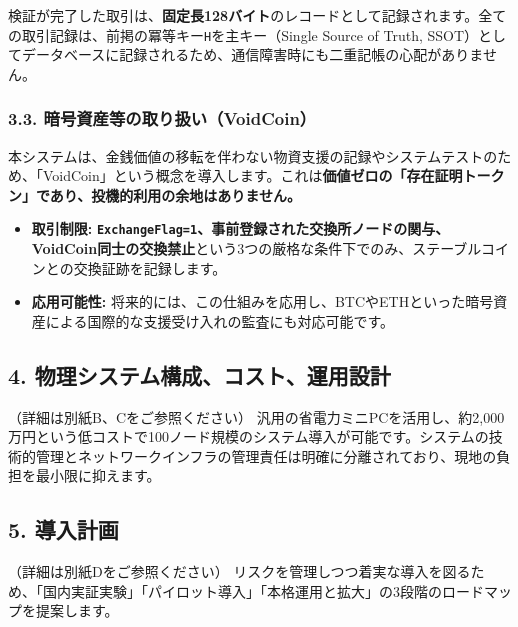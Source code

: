 \documentclass[
  a4paper,
  ja=standard,
  xelatex]{bxjsarticle}
\begin{document}
検証が完了した取引は、\textbf{固定長128バイト}のレコードとして記録されます。全ての取引記録は、前掲の冪等キー\texttt{H}を主キー（Single
Source of Truth,
SSOT）としてデータベースに記録されるため、通信障害時にも二重記帳の心配がありません。

\subsubsection{\texorpdfstring{\textbf{3.3.
暗号資産等の取り扱い（VoidCoin）}}{3.3. 暗号資産等の取り扱い（VoidCoin）}}\label{ux6697ux53f7ux8cc7ux7523ux7b49ux306eux53d6ux308aux6271ux3044voidcoin}

本システムは、金銭価値の移転を伴わない物資支援の記録やシステムテストのため、「VoidCoin」という概念を導入します。これは\textbf{価値ゼロの「存在証明トークン」であり、投機的利用の余地はありません。}

\begin{itemize}
\item
  \textbf{取引制限:}
  \textbf{\texttt{ExchangeFlag=1}、事前登録された交換所ノードの関与、VoidCoin同士の交換禁止}という3つの厳格な条件下でのみ、ステーブルコインとの交換証跡を記録します。
\item
  \textbf{応用可能性:}
  将来的には、この仕組みを応用し、BTCやETHといった暗号資産による国際的な支援受け入れの監査にも対応可能です。
\end{itemize}

\subsection{\texorpdfstring{\textbf{4.
物理システム構成、コスト、運用設計}}{4. 物理システム構成、コスト、運用設計}}\label{ux7269ux7406ux30b7ux30b9ux30c6ux30e0ux69cbux6210ux30b3ux30b9ux30c8ux904bux7528ux8a2dux8a08}

（詳細は別紙B、Cをご参照ください）
汎用の省電力ミニPCを活用し、約2,000万円という低コストで100ノード規模のシステム導入が可能です。システムの技術的管理とネットワークインフラの管理責任は明確に分離されており、現地の負担を最小限に抑えます。

\subsection{\texorpdfstring{\textbf{5.
導入計画}}{5. 導入計画}}\label{ux5c0eux5165ux8a08ux753b}

（詳細は別紙Dをご参照ください）
リスクを管理しつつ着実な導入を図るため、「国内実証実験」「パイロット導入」「本格運用と拡大」の3段階のロードマップを提案します。
\end{document}

